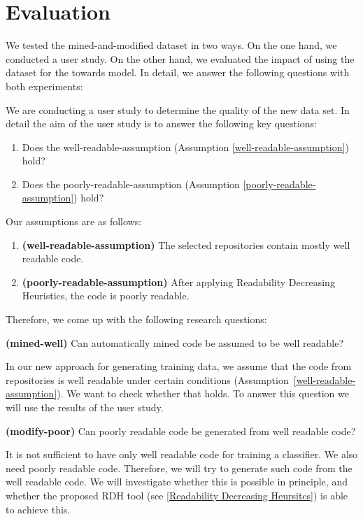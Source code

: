\documentclass[%
class=scrreprt,
chapterprefix=false,%
open=right,%
twoside=false,%
paper=a4,%
logofile={Logo\_zentral\_farbig\_EN.png},%
thesistype=master,%
UKenglish,%
]{se2thesis}
\theoremstyle{definition}
\begin{document}
\section{Evaluation} \label{Evaluation}
	We tested the mined-and-modified dataset in two ways. On the one hand, we conducted a user study. On the other hand, we evaluated the impact of using the dataset for the towards model. In detail, we answer the following questions with both experiments:
	
	
	We are conducting a user study to determine the quality of the new data set. In detail the aim of the user study is to answer the following key questions:
	\begin{enumerate}
		\item Does the well-readable-assumption (Assumption \ref{well-readable-assumption}) hold?
		\item Does the poorly-readable-assumption (Assumption \ref{poorly-readable-assumption}) hold?
	\end{enumerate}
	
	Our assumptions are as follows:
	\begin{enumerate}[label={Assumption \arabic*},ref={\arabic*},leftmargin=*]
		\item \label{well-readable-assumption} \textbf{(well-readable-assumption)} The selected repositories contain mostly well readable code.
		\item \label{poorly-readable-assumption} \textbf{(poorly-readable-assumption)} After applying Readability Decreasing Heuristics, the code is poorly readable.
	\end{enumerate}
	
	Therefore, we come up with the following research questions:
	
	\begin{resq} \textbf{(mined-well)} Can automatically mined code be assumed to be well readable?\end{resq} \label{mined-well}
	In our new approach for generating training data, we assume that the code from repositories is well readable under certain conditions (Assumption~\ref{well-readable-assumption}). We want to check whether that holds. To answer this question we will use the results of the user study.
	
	\begin{resq} \textbf{(modify-poor)} Can poorly readable code be generated from well readable code?\end{resq} \label{modify-poor}
	It is not sufficient to have only well readable code for training a classifier. We also need poorly readable code. Therefore, we will try to generate such code from the well readable code. We will investigate whether this is possible in principle, and
	whether the proposed RDH tool (see \autoref{Readability Decreasing Heursitcs}) is able to achieve this.
	
\end{document}
